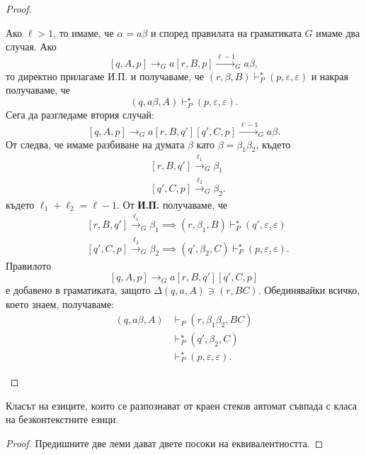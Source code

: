 \begin{proof}
\begin{description}
    Ако $\ell > 1$, то имаме, че $\alpha = a\beta$ и според правилата на граматиката $G$ имаме два случая.
    Ако
    \[[q,A,p] \rightarrow_G a[r,B,p] \stackrel{\ell-1}{\to}_G a\beta,\]
    то директно прилагаме И.П. и получаваме, че
    $(r, \beta, B) \vdash^\star_P (p, \varepsilon, \varepsilon)$ и накрая получаваме, че
    \[(q, a\beta, A) \vdash^\star_P (p, \varepsilon, \varepsilon).\]
    Сега да разгледаме втория случай:
    \[[q,A,p] \rightarrow_G a[r,B,q'][q',C,p] \stackrel{\ell-1}{\to}_G a\beta.\]
    От  следва, че имаме разбиване на думата $\beta$ като $\beta = \beta_1\beta_2$, където 
    \begin{align*}
      & [r,B,q'] \stackrel{\ell_1}{\to}_G \beta_1\\
      & [q',C,p] \stackrel{\ell_2}{\to}_G \beta_2.
    \end{align*}
    където $\ell_1 + \ell_2 = \ell - 1$.
    От {\bf И.П.} получаваме, че 
    \begin{align*}
      & [r,B,q'] \stackrel{\ell_1}{\to}_G \beta_1 \implies (r,\beta_1,B) \vdash^\star_P (q',\varepsilon,\varepsilon) \\
      & [q',C,p] \stackrel{\ell_2}{\to}_G \beta_2 \implies (q',\beta_2,C) \vdash^\star_P (p,\varepsilon,\varepsilon).
    \end{align*}
    Правилото
    \[[q,A,p] \rightarrow_G a[r,B,q'][q',C,p]\]
    е добавено в граматиката, защото $\Delta(q,a,A) \ni (r, BC)$. 
    Обединявайки всичко, което знаем, получаваме:
    \begin{align*}
      (q, a\beta, A) & \vdash_P (r, \beta_1\beta_2, BC)\\
                     & \vdash^\star_P (q', \beta_2, C)\\
                     & \vdash^\star_P (p, \varepsilon, \varepsilon).
    \end{align*}    
  \end{description}
\end{proof}
  
\begin{framed}
\begin{thm}
  \label{th:push-down-context-free}
  Класът на езиците, които се разпознават от краен стеков автомат съвпада с
  класа на безконтекстните езици.
\end{thm}
\end{framed}
\begin{proof}
  Предишните две леми дават двете посоки на еквивалентността.
\end{proof}

